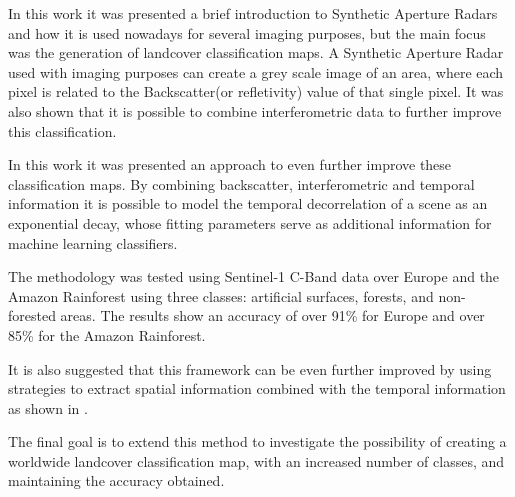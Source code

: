 In this work it was presented a brief introduction to Synthetic Aperture Radars and how it is used nowadays for several imaging purposes, but the main focus was the generation of landcover classification maps. A Synthetic Aperture Radar used with imaging purposes can create a grey scale image of an area, where each pixel is related to the Backscatter(or refletivity) value of that single pixel. It was also shown that it is possible to combine interferometric data to further improve this classification.

In this work it was presented an approach to even further improve these classification maps. By combining backscatter, interferometric and temporal information it is possible to model the temporal decorrelation of a scene as an exponential decay, whose fitting parameters serve as additional information for machine learning classifiers.

The methodology was tested using Sentinel-1 C-Band data over Europe and the Amazon Rainforest using three classes: artificial surfaces, forests, and non-forested areas. The results show an accuracy of over 91\% for Europe and over 85\% for the Amazon Rainforest.

It is also suggested that this framework can be even further improved by using strategies to extract spatial information combined with the temporal information as shown in \cite{rodrigo}.

The final goal is to extend this method to investigate the possibility of creating a worldwide landcover classification map, with an increased number of classes, and maintaining the accuracy obtained.